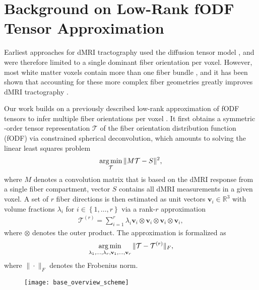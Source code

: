 \section{Background on Low-Rank fODF Tensor Approximation}\label{sec:background}
Earliest approaches for dMRI tractography used the diffusion tensor model
\cite{Mori:1999}, and were therefore limited to a single dominant fiber orientation
per voxel. However, most white matter voxels contain more than one fiber bundle \cite{Jeurissen:2012}, and it has been shown
that accounting for these more complex fiber geometries greatly improves dMRI
tractography \cite{Neher:2015}.

Our work builds on a previously described low-rank approximation of fODF tensors to infer multiple fiber orientations per voxel \cite{lowrank,Ankele:CARS2017}. It first obtains a symmetric -order tensor representation $\mathcal{T}$ of the fiber orientation distribution function (fODF) via constrained spherical deconvolution, which amounts to solving the linear least squares problem 
\begin{align}
	\operatorname*{arg\,min}_{\mathcal{T}} \| M \mathcal{T} - S \|^2,
	\label{eq:sd-min}
\end{align}
where 
$M$ denotes a convolution matrix that is based on the dMRI response from a
single fiber compartment, vector $S$ contains all dMRI measurements in a given
voxel. A set of $r$ fiber directions is then estimated as unit vectors
$\mathbf{v}_i \in \mathbb{R}^3$ with volume fractions $\lambda_i$ for $i \in
\left\{ 1 , \dots , r \right\}$ via a rank-$r$
approximation 
\begin{align}
	\mathcal{T}^{\left( r \right)} = \sum_{i=1}^r \lambda_i \mathbf{v}_i
	\otimes \mathbf{v}_i \otimes \mathbf{v}_i \otimes \mathbf{v}_i,
	\label{eq:low-rank}
\end{align}
where $\otimes$ denotes the
outer product. The approximation is formalized as
\[ \operatorname*{arg\,min}_{\lambda_1, \dots , \lambda_r , \mathbf{v}_1, \dots , \mathbf{v}_r}
\| \mathcal{T} - \mathcal{T}^{\left( r \right)} \|_F, \]
where $\| \cdot \|_F$ denotes the Frobenius norm.

\begin{figure*}[t]
	\centering
	\texttt{[image: base\_overview\_scheme]}
	\caption{}
	\label{fig:base_overview}
\end{figure*}

